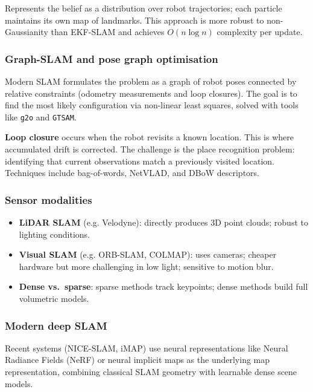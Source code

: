 Represents the belief as a distribution over robot trajectories; each particle maintains its own map of landmarks. This approach is more robust to non-Gaussianity than EKF-SLAM and achieves $O(n \log n)$ complexity per update.

\subsubsection{Graph-SLAM and pose graph optimisation}

Modern SLAM formulates the problem as a graph of robot poses connected by relative constraints (odometry measurements and loop closures). The goal is to find the most likely configuration via non-linear least squares, solved with tools like \texttt{g2o} and \texttt{GTSAM}.

\begin{notebox}
\textbf{Loop closure} occurs when the robot revisits a known location. This is where accumulated drift is corrected. The challenge is the place recognition problem: identifying that current observations match a previously visited location. Techniques include bag-of-words, NetVLAD, and DBoW descriptors.
\end{notebox}

\subsubsection{Sensor modalities}

\begin{itemize}
\item \textbf{LiDAR SLAM} (e.g. Velodyne): directly produces 3D point clouds; robust to lighting conditions.
\item \textbf{Visual SLAM} (e.g. ORB-SLAM, COLMAP): uses cameras; cheaper hardware but more challenging in low light; sensitive to motion blur.
\item \textbf{Dense vs.\ sparse}: sparse methods track keypoints; dense methods build full volumetric models.
\end{itemize}

\subsubsection{Modern deep SLAM}

Recent systems (NICE-SLAM, iMAP) use neural representations like Neural Radiance Fields (NeRF) or neural implicit maps as the underlying map representation, combining classical SLAM geometry with learnable dense scene models.

